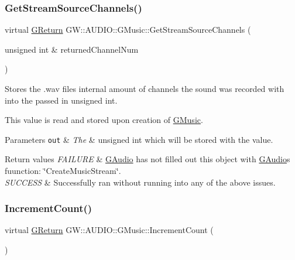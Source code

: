 \subsubsection{\texorpdfstring{Get\+Stream\+Source\+Channels()}{GetStreamSourceChannels()}}
{\footnotesize\ttfamily virtual \mbox{\hyperlink{namespace_g_w_a67a839e3df7ea8a5c5686613a7a3de21}{G\+Return}} G\+W\+::\+A\+U\+D\+I\+O\+::\+G\+Music\+::\+Get\+Stream\+Source\+Channels (\begin{DoxyParamCaption}\item[{unsigned int \&}]{returned\+Channel\+Num }\end{DoxyParamCaption})\hspace{0.3cm}{\ttfamily [pure virtual]}}



Stores the .wav files internal amount of channels the sound was recorded with into the passed in unsigned int. 

This value is read and stored upon creation of \mbox{\hyperlink{class_g_w_1_1_a_u_d_i_o_1_1_g_music}{G\+Music}}.


\begin{DoxyParams}[1]{Parameters}
\mbox{\tt out}  & {\em The} & unsigned int which will be stored with the value.\\
\hline
\end{DoxyParams}

\begin{DoxyRetVals}{Return values}
{\em F\+A\+I\+L\+U\+RE} & \mbox{\hyperlink{class_g_w_1_1_a_u_d_i_o_1_1_g_audio}{G\+Audio}} has not filled out this object with \mbox{\hyperlink{class_g_w_1_1_a_u_d_i_o_1_1_g_audio}{G\+Audio}}\textquotesingle{}s fuunction\+: \char`\"{}\+Create\+Music\+Stream\char`\"{}. \\
\hline
{\em S\+U\+C\+C\+E\+SS} & Successfully ran without running into any of the above issues. \\
\hline
\end{DoxyRetVals}
\mbox{\label{class_g_w_1_1_a_u_d_i_o_1_1_g_music_a22d7a170b4d307e5398ebb92f950431f}} 
\subsubsection{\texorpdfstring{Increment\+Count()}{IncrementCount()}}
{\footnotesize\ttfamily virtual \mbox{\hyperlink{namespace_g_w_a67a839e3df7ea8a5c5686613a7a3de21}{G\+Return}} G\+W\+::\+A\+U\+D\+I\+O\+::\+G\+Music\+::\+Increment\+Count (\begin{DoxyParamCaption}{ }\end{DoxyParamCaption})\hspace{0.3cm}{\ttfamily [pure virtual]}}



